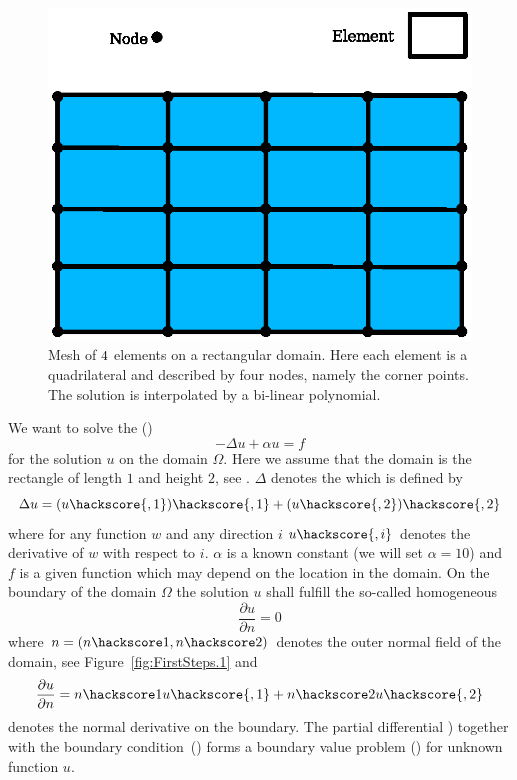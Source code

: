 \begin{figure}
\centerline{\includegraphics[width=\figwidth]{FirstStepMesh}}
\caption{Mesh of $4 \time 4$ elements on a rectangular domain.  Here
each element is a quadrilateral and described by four nodes, namely
the corner points. The solution is interpolated by a bi-linear
polynomial.}
\label{fig:FirstSteps.2}
\end{figure}

We want to solve the ()
\begin{equation}
-\Delta u + \alpha u =f 
\label{eq:FirstSteps.1}
\end{equation}
for the solution $u$ on the domain $\Omega$.  Here we assume that the
domain is the rectangle of length $1$ and height $2$, see
.  $\Delta$ denotes the  which is defined by
\begin{equation}
\Delta u = (u\hackscore {,1})\hackscore{,1}+(u\hackscore{,2})\hackscore{,2}
\label{eq:FirstSteps.1.1}
\end{equation}
where for any function $w$ and any direction $i$ $u\hackscore{,i}$
denotes the derivative of $w$ with respect to $i$.  $\alpha$ is a
known constant (we will set $\alpha=10$) and $f$ is a given function
which may depend on the location in the domain.  On the boundary of
the domain $\Omega$ the solution $u$ shall fulfill the so-called
homogeneous 
\begin{equation}
\frac{\partial u}{\partial n} = 0
\label{eq:FirstSteps.2}
\end{equation}
where $n=(n\hackscore1,n\hackscore2)$ denotes the outer normal field
of the domain, see Figure~\ref{fig:FirstSteps.1} and
\begin{equation}
\frac{\partial u}{\partial n} = n\hackscore1 u\hackscore{,1} +
n\hackscore2 u\hackscore{,2}
\label{eq:FirstSteps.2.1}
\end{equation}
denotes the normal derivative on the boundary.  The partial
differential ) together with the
boundary condition~() forms a boundary value
problem () for unknown function $u$.

